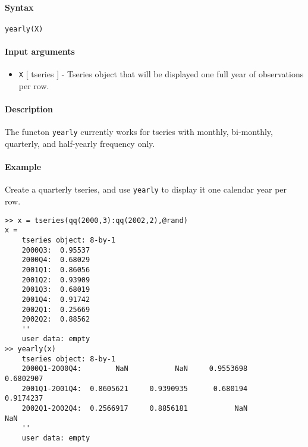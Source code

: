 


	\paragraph{Syntax}

\begin{verbatim}
yearly(X)
\end{verbatim}

\paragraph{Input arguments}

\begin{itemize}
\itemsep1pt\parskip0pt
\item
  \texttt{X} {[} tseries {]} - Tseries object that will be displayed one
  full year of observations per row.
\end{itemize}

\paragraph{Description}

The functon \texttt{yearly} currently works for tseries with monthly,
bi-monthly, quarterly, and half-yearly frequency only.

\paragraph{Example}

Create a quarterly tseries, and use \texttt{yearly} to display it one
calendar year per row.

\begin{verbatim}
>> x = tseries(qq(2000,3):qq(2002,2),@rand)
x =
    tseries object: 8-by-1
    2000Q3:  0.95537
    2000Q4:  0.68029
    2001Q1:  0.86056
    2001Q2:  0.93909
    2001Q3:  0.68019
    2001Q4:  0.91742
    2002Q1:  0.25669
    2002Q2:  0.88562
    ''
    user data: empty
>> yearly(x)
    tseries object: 8-by-1
    2000Q1-2000Q4:        NaN           NaN     0.9553698     0.6802907
    2001Q1-2001Q4:  0.8605621     0.9390935      0.680194     0.9174237
    2002Q1-2002Q4:  0.2566917     0.8856181           NaN           NaN
    ''
    user data: empty
\end{verbatim}


